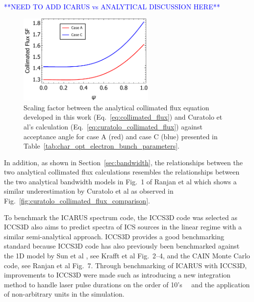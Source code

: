 \documentclass[../main.tex]{subfiles}
\begin{document}
\textcolor{blue}{**NEED TO ADD ICARUS vs ANALYTICAL DISCUSSION HERE**}

\begin{figure}[!h]
\centering
\includegraphics[width=0.6\textwidth]{Figures/Optimisation_and_Characterisation_of_Inverse_Compton_Scattering_Sources/Opt_Char_Fcol_Curatolo_SF.pdf}
\caption{Scaling factor between the analytical collimated flux equation developed in this work (Eq.~\ref{eq:collimated_flux}) and Curatolo et al's \cite{curatolo2017analytical} calculation (Eq.~\ref{eq:curatolo_collimated_flux}) against acceptance angle for case A (red) and case C (blue) presented in Table~\ref{tab:char_opt_electron_bunch_parameters}.}
\label{fig:curatolo_scaling_factor_comparison}
\end{figure}

In addition, as shown in Section~\ref{sec:bandwidth}, the relationships between the two analytical collimated flux calculations resembles the relationships between the two analytical bandwidth models in Fig.~1 of Ranjan et al \cite{ranjan2018simulation} which shows a similar underestimation by Curatolo et al \cite{curatolo2017analytical} as observed in Fig.~\ref{fig:curatolo_collimated_flux_comparison}.

To benchmark the \textsc{ICARUS} spectrum code, the \textsc{ICCS3D} code \cite{krafft2016laser,ranjan2018simulation} was selected as \textsc{ICCS3D} also aims to predict spectra of ICS sources in the linear regime with a similar semi-analytical approach. \textsc{ICCS3D} provides a good benchmarking standard because  \textsc{ICCS3D} code has also previously been benchmarked against the 1D model by Sun et al \cite{sun2009energy}, see Krafft et al \cite{krafft2016laser} Fig.~2--4, and the \textsc{CAIN} Monte Carlo code, see Ranjan et al\cite{ranjan2018simulation} Fig.~7. Through benchmarking of \textsc{ICARUS} with \textsc{ICCS3D}, improvements to \textsc{ICCS3D} were made such as introducing a new integration method to handle laser pulse durations on the order of 10's~\si{\pico\seconds} and the application of non-arbitrary units in the simulation.
\end{document}
